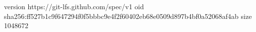 version https://git-lfs.github.com/spec/v1
oid sha256:ff527b1c9f647294f0f5bbbc9e4f2f60402eb68e0509d897b4bf0a52068af4ab
size 1048672
